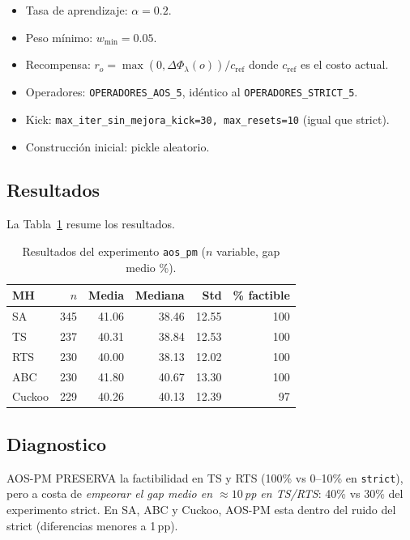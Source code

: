 \begin{itemize}
\item Tasa de aprendizaje: $\alpha = 0.2$.
\item Peso mínimo: $w_{\min} = 0.05$.
\item Recompensa: $r_o = \max(0, \Delta\Phi_\lambda(o)) / c_{\text{ref}}$
  donde $c_{\text{ref}}$ es el costo actual.
\item Operadores: \texttt{OPERADORES\_AOS\_5}, idéntico al
  \texttt{OPERADORES\_STRICT\_5}.
\item Kick: \texttt{max\_iter\_sin\_mejora\_kick=30, max\_resets=10}
  (igual que strict).
\item Construcción inicial: pickle aleatorio.
\end{itemize}

\subsection{Resultados}

La Tabla~\ref{tab:aos-resultados} resume los resultados.

\begin{table}[h]
\centering
\caption{Resultados del experimento \texttt{aos\_pm} ($n$ variable, gap medio \%).}
\label{tab:aos-resultados}
\small
\begin{tabular}{lrrrrr}
\toprule
MH & $n$ & Media & Mediana & Std & \% factible \\
\midrule
SA      & 345 & 41.06 & 38.46 & 12.55 & 100 \\
TS      & 237 & 40.31 & 38.84 & 12.53 & 100 \\
RTS     & 230 & 40.00 & 38.13 & 12.02 & 100 \\
ABC     & 230 & 41.80 & 40.67 & 13.30 & 100 \\
Cuckoo  & 229 & 40.26 & 40.13 & 12.39 & 97 \\
\bottomrule
\end{tabular}
\end{table}

\subsection{Diagnostico}

AOS-PM PRESERVA la factibilidad en TS y RTS (100\% vs 0--10\% en
\texttt{strict}), pero a costa de \emph{empeorar el gap medio en
$\approx 10$\,pp en TS/RTS}: 40\% vs 30\% del experimento strict. En
SA, ABC y Cuckoo, AOS-PM esta dentro del ruido del strict (diferencias
menores a 1\,pp).

